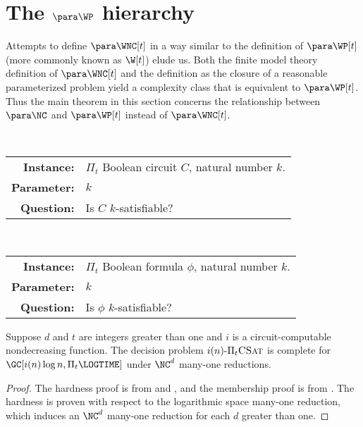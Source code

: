 \section{The \texorpdfstring{$\para \WP$}{paraWP} hierarchy}

Attempts to define $\para \WNC[t]$ in a way similar to the definition of $\para \WP[t]$ (more commonly known as $\W[t]$) elude us.
Both the finite model theory definition of $\para \WNC[t]$ and the definition as the closure of a reasonable parameterized problem yield a complexity class that is equivalent to $\para \WP[t]$.
Thus the main theorem in this section concerns the relationship between $\para \NC$ and $\para \WP[t]$ instead of $\para \WNC[t]$.

\begin{definition}
  \mbox{} \\
  \begin{tabular}{r p{9.2cm}}
    \textbf{Instance:} & $\Pi_t$ Boolean circuit $C$, natural number $k$. \\
    \textbf{Parameter:} & $k$ \\
    \textbf{Question:} & Is $C$ $k$-satisfiable?
  \end{tabular}
\end{definition}

\begin{definition}
  \mbox{} \\
  \begin{tabular}{r p{9.2cm}}
    \textbf{Instance:} & $\Pi_t$ Boolean formula $\phi$, natural number $k$. \\
    \textbf{Parameter:} & $k$ \\
    \textbf{Question:} & Is $\phi$ $k$-satisfiable?
  \end{tabular}
\end{definition}

\begin{theorem}\label{thm:picsatgc}
  Suppose $d$ and $t$ are integers greater than one and $i$ is a circuit-computable nondecreasing function.
  The decision problem $i(n) \textnormal{-} \Pi_t \textsc{CSat}$ is complete for $\GC[i(n) \log n, \Pi_t \LOGTIME]$ under $\NC^d$ many-one reductions.
\end{theorem}
\begin{proof}
  The hardness proof is from \autocite[Theorem~4.4]{cc97lim} and \autocite[Theorem~4.7]{cc97lim}, and the membership proof is from \autocite[Theorem~4.1]{cc97npo}.
  The hardness is proven with respect to the logarithmic space many-one reduction, which induces an $\NC^d$ many-one reduction for each $d$ greater than one.
\end{proof}


